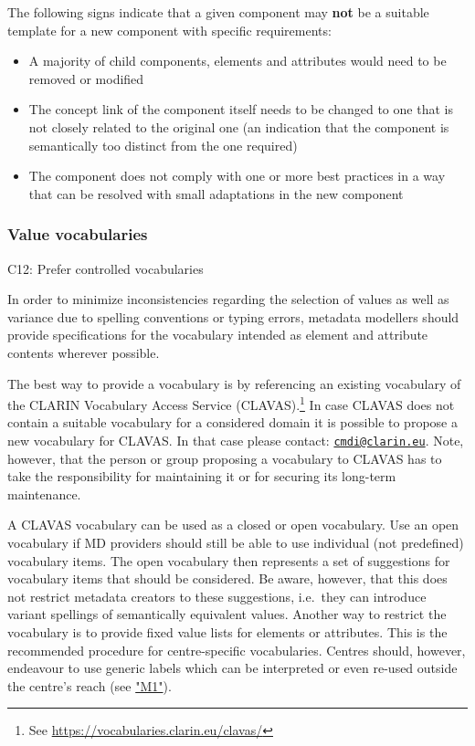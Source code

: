 The following signs indicate that a given component may \textbf{not} be a suitable template for a new component with specific requirements:

\begin{itemize}
\tightlist
\item
  A majority of child components, elements and attributes would need to be removed or modified
\item
  The concept link of the component itself needs to be changed to one that is not closely related to the original one (an indication that the component is semantically too distinct from the one required)
\item
  The component does not comply with one or more best practices in a way that can be resolved with small adaptations in the new component
\end{itemize}

\subsubsection{Value vocabularies}\label{value-vocabularies}

\label{c12}
C12: Prefer controlled vocabularies

 

In order to minimize inconsistencies regarding the selection of values as well as variance due to spelling conventions or typing errors, metadata modellers should provide specifications for the vocabulary intended as element and attribute contents wherever possible.

The best way to provide a vocabulary is by referencing an existing vocabulary of the CLARIN Vocabulary Access Service (CLAVAS).\footnote{See \url{https://vocabularies.clarin.eu/clavas/}} In case CLAVAS does not contain a suitable vocabulary for a considered domain it is possible to propose a new vocabulary for CLAVAS. In that case please contact: \href{mailto:cmdi@clarin.eu}{\nolinkurl{cmdi@clarin.eu}}. Note, however, that the person or group proposing a vocabulary to CLAVAS has to take the responsibility for maintaining it or for securing its long-term maintenance.

A CLAVAS vocabulary can be used as a closed or open vocabulary. Use an open vocabulary if MD providers should still be able to use individual (not predefined) vocabulary items. The open vocabulary then represents a set of suggestions for vocabulary items that should be considered. Be
aware, however, that this does not restrict metadata creators to these suggestions, i.e.~they can introduce variant spellings of semantically equivalent values. Another way to restrict the vocabulary is to provide fixed value lists for elements or attributes. This is the recommended procedure for centre-specific vocabularies. Centres should, however, endeavour to use generic labels which can be interpreted or even re-used outside the centre's reach (see \hyperref[m1]{"M1"}).

